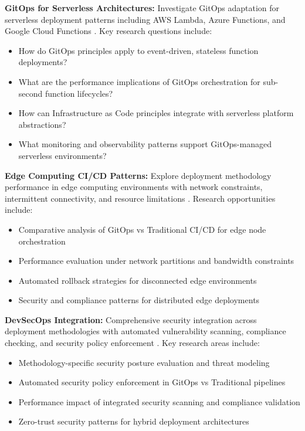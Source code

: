 \textbf{GitOps for Serverless Architectures:} Investigate GitOps adaptation for serverless deployment patterns including AWS Lambda, Azure Functions, and Google Cloud Functions \cite{serverless_computing}. Key research questions include:
\begin{itemize}
\item How do GitOps principles apply to event-driven, stateless function deployments?
\item What are the performance implications of GitOps orchestration for sub-second function lifecycles?
\item How can Infrastructure as Code principles integrate with serverless platform abstractions?
\item What monitoring and observability patterns support GitOps-managed serverless environments?
\end{itemize}

\textbf{Edge Computing CI/CD Patterns:} Explore deployment methodology performance in edge computing environments with network constraints, intermittent connectivity, and resource limitations \cite{edge_computing}. Research opportunities include:
\begin{itemize}
\item Comparative analysis of GitOps vs Traditional CI/CD for edge node orchestration
\item Performance evaluation under network partitions and bandwidth constraints
\item Automated rollback strategies for disconnected edge environments
\item Security and compliance patterns for distributed edge deployments
\end{itemize}

\textbf{DevSecOps Integration:} Comprehensive security integration across deployment methodologies with automated vulnerability scanning, compliance checking, and security policy enforcement \cite{devsecops}. Key research areas include:
\begin{itemize}
\item Methodology-specific security posture evaluation and threat modeling
\item Automated security policy enforcement in GitOps vs Traditional pipelines
\item Performance impact of integrated security scanning and compliance validation
\item Zero-trust security patterns for hybrid deployment architectures
\end{itemize}

